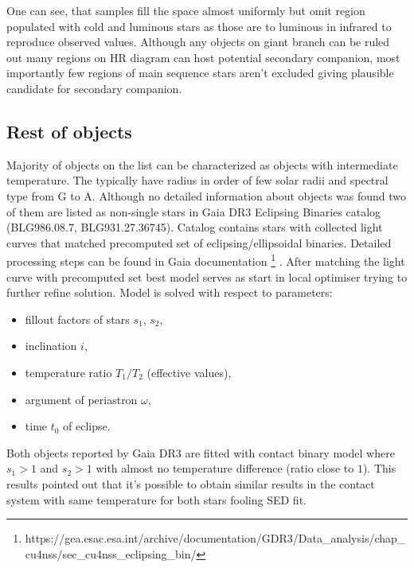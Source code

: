 \documentclass{pracalicmgr}
\begin{document}
One can see, that samples fill the space almost uniformly but omit region populated with cold and luminous stars as 
those are to luminous in infrared to reproduce observed values.
Although  any objects on giant branch can be ruled out many regions on HR diagram can host potential secondary companion, most importantly
few regions of main sequence stars aren't excluded giving plausible candidate for secondary companion.
\subsection{Rest of objects}
Majority of objects on the list can be characterized as objects with intermediate temperature. The typically have radius in order of 
few solar radii and spectral type from G to A. Although no detailed information about objects was found two of them
are listed as non-single stars in Gaia DR3 Eclipsing Binaries catalog (BLG986.08.7, BLG931.27.36745).
Catalog contains stars with collected light curves that matched precomputed set of eclipsing/ellipsoidal binaries. 
Detailed processing steps can be found in Gaia documentation \footnote[1]{https://gea.esac.esa.int/archive/documentation/GDR3/Data\_analysis/chap\_cu4nss/sec\_cu4nss\_eclipsing\_bin/}
. After matching the light curve with precomputed set best model serves as start in local optimiser 
trying to further refine solution. Model is solved with respect to parameters:
\begin{itemize}
    \setlength\itemsep{1em}
    \item fillout factors of stars $s_1$, $s_2$,
    \item inclination $i$,
    \item temperature ratio $T_1/T_2$ (effective values),
    \item argument of periastron $\omega$,
    \item time $t_0$ of eclipse.
\end{itemize}
Both objects reported by Gaia DR3 are fitted with contact binary model where $s_1>1$ and $s_2>1$ with almost no 
temperature difference (ratio close to $1$). This results pointed out that it's possible to obtain similar results 
in the contact system with same temperature for both stars fooling SED fit. 
\end{document}
